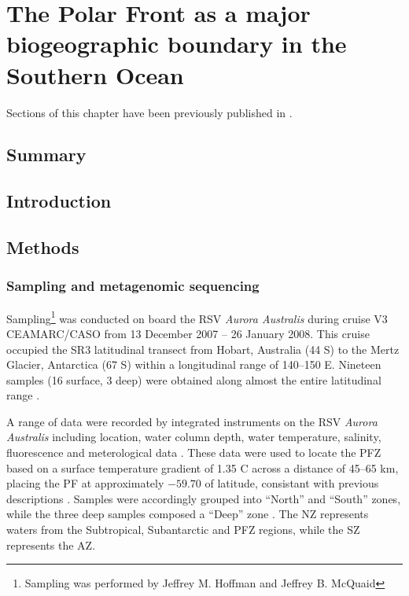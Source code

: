 \chapter{The Polar Front as a major biogeographic boundary in the Southern Ocean} 
\label{ch:polarfront}

Sections of this chapter have been previously published in .

\section{Summary}

\section{Introduction}


\section{Methods}
\subsection{Sampling and metagenomic sequencing}

Sampling\footnote{Sampling was performed by Jeffrey M. Hoffman and Jeffrey B. McQuaid} was conducted on board the RSV \emph{Aurora Australis} during cruise V3 \ac{CEAMARC/CASO} from 13 December 2007 -- 26 January 2008. 
This cruise occupied the SR3 latitudinal transect from Hobart, Australia (44\textdegree{} S) to the Mertz Glacier, Antarctica (67\textdegree{} S) within a longitudinal range of 140--150\textdegree{} E.
Nineteen samples (16 surface, 3 deep) were obtained along almost the entire latitudinal range .



A range of data were recorded by integrated instruments on the RSV \emph{Aurora Australis} including location, water column depth, water temperature, salinity, fluorescence and meterological data .
These data were used to locate the \ac{PFZ} based on a surface temperature gradient of \textapprox{} 1.35 \textdegree{}C across a distance of 45--65 km, placing the \ac{PF} at approximately $-59.70$\textdegree{} of latitude, consistant with previous descriptions \cite{Moore:1999to,Sokolov:2002tc}.
Samples were accordingly grouped into ``North'' and ``South'' zones, while the three deep samples composed a ``Deep'' zone .
The \ac{NZ} represents waters from the Subtropical, Subantarctic and \ac{PFZ} regions, while the \ac{SZ} represents the \ac{AZ}.

